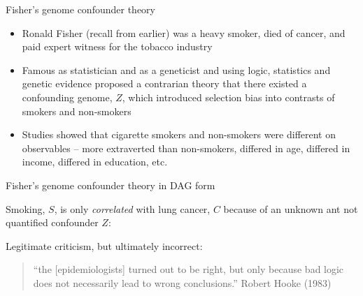 \documentclass{beamer}
\begin{document}
\begin{frame}{Fisher's genome confounder theory}
		\begin{itemize}
		\item Ronald Fisher (recall from earlier) was a heavy smoker, died of cancer, and paid expert witness for the tobacco industry
		\item Famous as statistician and as a geneticist and using logic, statistics and genetic evidence proposed a contrarian theory that there existed a confounding genome, $Z$, which introduced selection bias into contrasts of smokers and non-smokers 
		\item Studies showed that cigarette smokers and non-smokers were different on observables -- more extraverted than non-smokers, differed in age, differed in income, differed in education, etc.
		\end{itemize}
\end{frame}

\begin{frame}{Fisher's genome confounder theory in DAG form}
	
Smoking, $S$, is only \emph{correlated} with lung cancer, $C$ because of an unknown ant not quantified confounder $Z$:

  \begin{center}
  \end{center}

Legitimate criticism, but ultimately incorrect:

\bigskip

  \begin{quote}  
    ``the [epidemiologists] turned out to be right, but only because bad logic does not necessarily lead to wrong conclusions.'' Robert Hooke (1983)
  \end{quote}

	
\end{frame}
\end{document}
